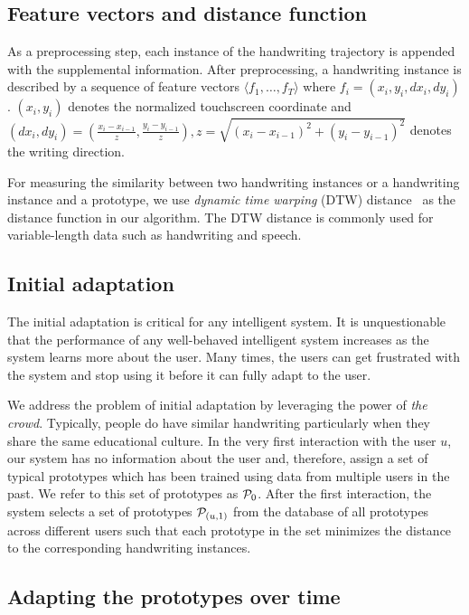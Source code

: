 \documentclass{sigchi}
\begin{document}
\subsection{Feature vectors and distance function}

As a preprocessing step, each instance of the handwriting trajectory
is appended with the supplemental information. After
preprocessing, a handwriting instance is described by a sequence of
feature vectors $\langle f_1, \ldots, f_T \rangle$ where
$f_i = (x_i,y_i, dx_i,dy_i)$. $(x_i,y_i)$ denotes the normalized
touchscreen coordinate and $(dx_i,dy_i) = (\frac{x_i - x_{i-1}}{z},
\frac{y_i - y_{i-1}}{z}) , z = \sqrt{(x_i - x_{i-1})^2 + (y_i -
  y_{i-1})^2}$ denotes the writing direction.

For measuring the similarity between two handwriting instances or a
handwriting instance and a prototype, we use {\it dynamic time
  warping} (DTW) distance~\cite{Rabiner1993} as the distance function
in our algorithm. The DTW distance is commonly used for
variable-length data such as handwriting and speech.

\subsection{Initial adaptation}

The initial adaptation is critical for any intelligent system. It is
unquestionable that the performance of any well-behaved
intelligent system increases as the system learns more about the
user. Many times, the users can get frustrated with the system and stop
using it before it can fully adapt to the user.
 
We address the problem of initial adaptation by leveraging the power
of {\em the crowd}. Typically, people do have similar handwriting
particularly when they share the same educational culture. In the very
first interaction with the user $u$, our system has no information
about the user and, therefore, assign a set of typical prototypes
which has been trained using data from multiple users in the past.  We
refer to this set of prototypes as $\mathcal{P}_0$. After the first
interaction, the system selects a set of prototypes
$\mathcal{P}_{(u,1)}$ from the database of all prototypes across
different users such that each prototype in the set minimizes the
distance to the corresponding handwriting instances.


\subsection{Adapting the prototypes over time}
\end{document}
